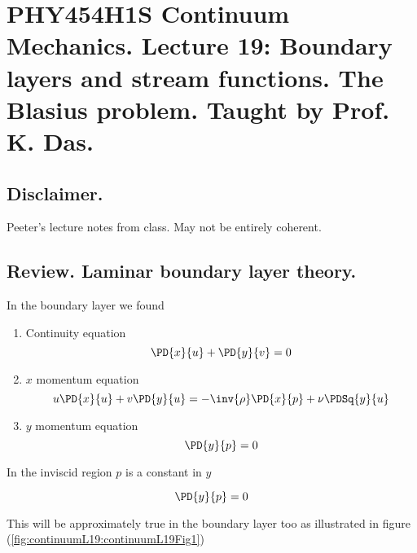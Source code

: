 
%

\chapter{PHY454H1S Continuum Mechanics.  Lecture 19: Boundary layers and stream functions.  The Blasius problem.  Taught by Prof. K. Das.}
\label{chap:continuumL19}
{}
\date{Mar 23, 2012}

\beginArtWithToc

\section{Disclaimer.}

Peeter's lecture notes from class.  May not be entirely coherent.

\section{Review.  Laminar boundary layer theory.}

In the boundary layer we found
\begin{enumerate}
\item Continuity equation
\begin{equation}\label{eqn:continuumL19:10}
\PD{x}{u} + \PD{y}{v} = 0
\end{equation}
\item $x$ momentum equation
\begin{equation}\label{eqn:continuumL19:30}
u \PD{x}{u} + v \PD{y}{u} = - \inv{\rho} \PD{x}{p} + \nu \PDSq{y}{u}
\end{equation}
\item $y$ momentum equation
\begin{equation}\label{eqn:continuumL19:50}
\PD{y}{p} = 0
\end{equation}
\end{enumerate}

In the inviscid region $p$ is a constant in $y$

\begin{equation}\label{eqn:continuumL19:70}
\PD{y}{p} = 0
\end{equation}

This will be approximately true in the boundary layer too as illustrated in figure (\ref{fig:continuumL19:continuumL19Fig1})


